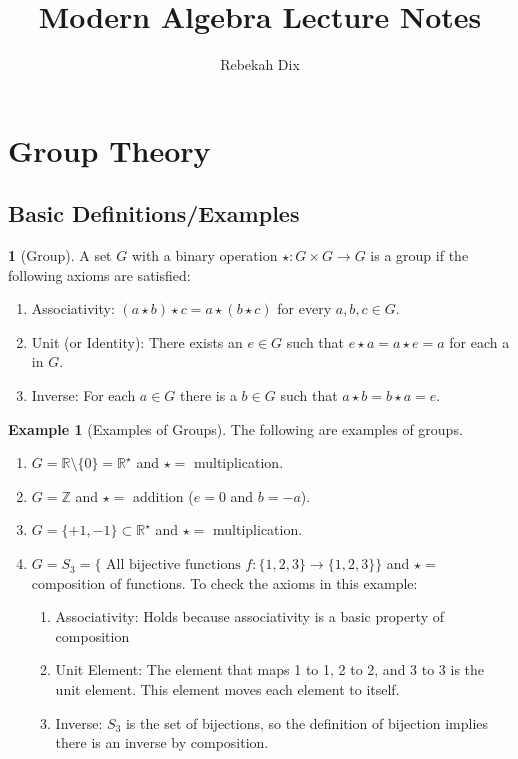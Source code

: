 \documentclass[12pt]{article}
\title{Modern Algebra Lecture Notes}
\author{Rebekah Dix}
\theoremstyle{definition}
\newtheorem{definition}{\color{NavyBlue}{\textbf{Definition}}}
\newtheorem{example}{\color{WildStrawberry}Example}
\theoremstyle{definition}
\begin{document}
\maketitle
\tableofcontents
\newpage 

\section{Group Theory}
\subsection{Basic Definitions/Examples}
\begin{definition}[Group]
A set $G$ with a binary operation $\star: G \times G \rightarrow G$ is a group if the following axioms are satisfied:
\begin{enumerate} 
\item Associativity: $(a \star b) \star c = a \star (b \star c)$ for every $a,b,c \in G$.
\item Unit (or Identity): There exists an $e \in G$ such that $e \star a = a \star e = a$ for each a in $G$.
\item Inverse: For each $a \in G$ there is a $b \in G$ such that $a \star b = b \star a = e$. 
\end{enumerate} 
\end{definition}

\begin{example}[Examples of Groups] 
The following are examples of groups.
\begin{enumerate}
\item $G = \mathbb{R} \setminus \{ 0 \} = \mathbb{R}^{\star}$ and $\star = $ multiplication. 
\item $G = \mathbb{Z}$ and $\star = $ addition ($e=0$ and $b=-a$).
\item $G = \{ +1, -1 \} \subset \mathbb{R}^{\star}$ and $\star = $ multiplication. 
\item $G = S_3 = \{ \text{ All bijective functions } f: \{1,2,3\} \rightarrow \{1,2,3\} \}$ and $\star = $ composition of functions. To check the axioms in this example:
\begin{enumerate}
\item Associativity: Holds because associativity is a basic property of composition
\item Unit Element: The element that maps 1 to 1, 2 to 2, and 3 to 3 is the unit element. This element moves each element to itself. 
\item Inverse: $S_3$ is the set of bijections, so the definition of bijection implies there is an inverse by composition.
\end{enumerate}
\end{enumerate}
\end{example}
\end{document}
